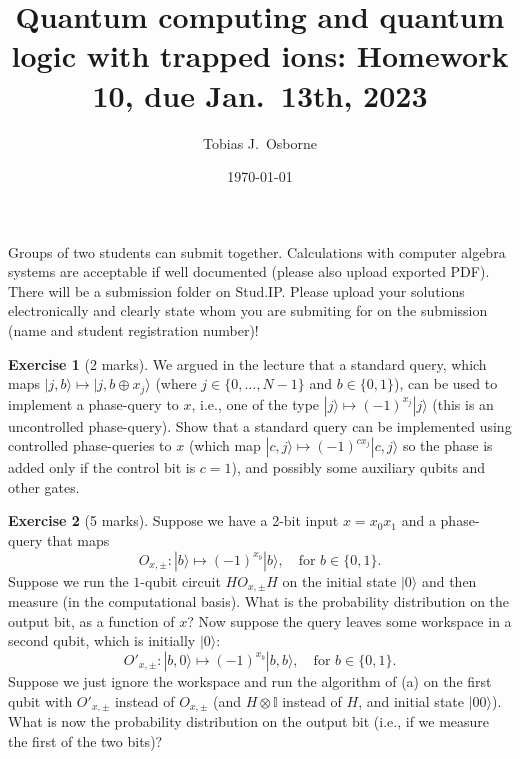 \documentclass[12pt,oneside]{amsart}
\title[Quantum computing and quantum logic with trapped ions]{Quantum computing and quantum logic with trapped ions: Homework 10, due Jan.\ 13th, 2023}
\author{Tobias J.\ Osborne}
\date{\today}                                           %
\theoremstyle{plain}%
\theoremstyle{definition}
\newtheorem{exercise}{\color{cgblue}Exercise}[section]
\theoremstyle{remark}
\begin{document}
\maketitle
Groups of two students can submit together. Calculations with computer algebra systems are acceptable if well documented (please also upload exported PDF). There will be a submission folder on Stud.IP. Please upload your solutions electronically and clearly state whom you are submiting for on the submission (name and student registration number)!

\setcounter{section}{1}

\begin{exercise}[2 marks]
  We argued in the lecture that a standard query, which maps $|j,b\rangle\mapsto |j,b\oplus x_j\rangle$ (where
$j\in \{0,\ldots , N − 1\}$ and $b \in \{0, 1\}$), can be used to implement a phase-query to $x$, i.e., one of
the type $|j\rangle \mapsto (-1)^{x_j}|j\rangle$ (this is an uncontrolled phase-query). Show that a standard query can be implemented using controlled phase-queries to $x$ (which map $|c,j\rangle \mapsto (-1)^{cx_j}|c,j\rangle$ so the phase is added only if the control bit is $c = 1$), and possibly some auxiliary qubits and other gates.
\end{exercise}

\begin{exercise}[5 marks]
  Suppose we have a 2-bit input $x = x_0 x_1$ and a phase-query that maps
  \begin{equation}
    O_{x,\pm}:|b\rangle \mapsto (-1)^{x_b}|b\rangle, \quad \text{for $b\in \{0,1\}$.}
  \end{equation}
  Suppose we run the $1$-qubit circuit $HO_{x,\pm}H$ on the initial state $|0\rangle$ and then measure (in the computational basis). What is the probability distribution on the output bit, as a function of $x$? Now suppose the query leaves some workspace in a second qubit, which is initially $|0\rangle$:
  \begin{equation}
    O'_{x,\pm}:|b,0\rangle \mapsto (-1)^{x_b}|b,b\rangle, \quad \text{for $b\in \{0,1\}$.}
  \end{equation}
  Suppose we just ignore the workspace and run the algorithm of (a) on the first qubit with $O'_{x,\pm}$ instead of $O_{x,\pm}$ (and $H\otimes \mathbb{I}$ instead of $H$, and initial state $|00\rangle$). What is now the probability distribution on the output bit (i.e., if we measure the first of the two bits)?
\end{exercise}
\end{document}
